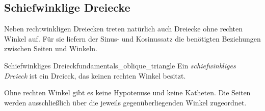 \subsection{Schiefwinklige Dreiecke}
\label{subsec:fundamentals_oblique_triangles}

Neben rechtwinkligen Dreiecken treten natürlich auch Dreiecke ohne rechten Winkel auf. Für
sie liefern der Sinus- und Kosinussatz die benötigten Beziehungen zwischen Seiten
und Winkeln.

\begin{DefinitionBox}{Schiefwinkliges Dreieck}{fundamentals_oblique_triangle}
  Ein \emph{schiefwinkliges Dreieck}  ist ein
  Dreieck, das keinen rechten Winkel besitzt.

  \begin{center}
  \end{center}
\end{DefinitionBox}

\begin{RemarkBox}[remark title=Seitenbezeichnungen ohne rechten Winkel]
  Ohne rechten Winkel gibt es keine Hypotenuse und keine Katheten. Die Seiten
  werden ausschließlich über die jeweils gegenüberliegenden Winkel
  zugeordnet.
\end{RemarkBox}



